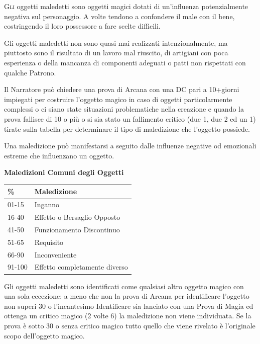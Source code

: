 \begin{multicols}{2}

	\label{oggetti-maledetti}

	\lettrine[lines=2, lhang=0.33, loversize=0.25, findent=1.5em]{G}{li} oggetti maledetti sono oggetti magici dotati di un'influenza potenzialmente negativa sul personaggio. A volte tendono a confondere il male con il bene, costringendo il loro possessore a fare scelte difficili.

	Gli oggetti maledetti non sono quasi mai realizzati intenzionalmente, ma piuttosto sono il risultato di un lavoro mal riuscito, di artigiani con poca esperienza o della mancanza di componenti adeguati o patti non rispettati con qualche Patrono.

	Il Narratore può chiedere una prova di Arcana con una DC pari a 10+giorni impiegati per costruire l'oggetto magico in caso di oggetti particolarmente complessi o ci siano state situazioni problematiche nella creazione e quando la prova fallisce di 10 o più o si sia stato un fallimento critico (due 1, due 2 ed un 1) tirate sulla tabella per determinare il tipo di maledizione che l'oggetto possiede.

	Una maledizione può manifestarsi a seguito dalle influenze negative od emozionali estreme che influenzano un oggetto.

	\medskip

	\textbf{Maledizioni Comuni degli Oggetti}

	\medskip

	\begin{tabular}{ll}
		\textbf{\%} & \textbf{Maledizione}\\
		\toprule
		01-15     & Inganno\\
		16-40       & Effetto o Bersaglio Opposto\\
		41-50       & Funzionamento Discontinuo\\
		51-65       & Requisito\\
		66-90       & Inconveniente\\
		91-100      & Effetto completamente diverso\\
	\end{tabular}

	\medskip

	Gli oggetti maledetti sono \hypertarget{oggettimaledettiid}{identificati} come qualsiasi altro oggetto magico con una sola eccezione: a meno che non la prova di Arcana per identificare l'oggetto non superi 30 o l'incantesimo Identificare sia lanciato con una Prova di Magia ed ottenga un critico magico (2 volte 6) la maledizione non viene individuata. Se la prova è sotto 30 o senza critico magico tutto quello che viene rivelato è l'originale scopo dell'oggetto magico.


\end{multicols}
